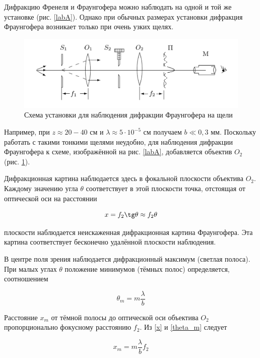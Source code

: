 \documentclass[a4paper,12pt]{article}
\begin{document}
Дифракцию Френеля и Фраунгофера можно наблюдать на одной
и той же установке (рис. \ref{labA}). Однако при обычных размерах установки дифракция Фраунгофера возникает только при очень узких щелях.

\begin{figure}[H]
	\centering
	\includegraphics[scale=0.15]{blab.jpeg}
	\caption{Схема установки для наблюдения дифракции Фраунгофера на щели}
	\label{labB}
\end{figure}

Например, при $ z \approx  20-40 $  см и $  \lambda \approx 5 \cdot 10^{-5}  $   см получаем $  b \ll 0,3 $ мм. Поскольку работать с такими тонкими щелями неудобно, для наблюдения дифракции Фраунгофера к схеме, изображённой на рис. \ref{labA}, добавляется объектив $ O_2  $ (рис. \ref{labB}).

Дифракционная картина наблюдается здесь в фокальной плоскости
объектива $ O_2 $. Каждому значению угла $ \theta $ соответствует в этой плоскости точка, отстоящая от оптической оси на расстоянии

\begin{equation}\label{x}
x = f_2 \tg \theta \approx f_2 \theta
\end{equation}


плоскости наблюдается неискаженная дифракционная картина Фраунгофера. Эта картина соответствует бесконечно удалённой плоскости
наблюдения.

В центре поля зрения наблюдается дифракционный максимум (светлая полоса). При малых углах $ \theta $ положение минимумов (тёмных полос)
определяется, соотношением

\begin{equation}\label{theta_m}
\theta_m = m \dfrac{\lambda}{b}
\end{equation}

Расстояние $ x_m $ от тёмной полосы до оптической оси объектива $ O_2 $ пропорционально фокусному расстоянию $ f_2 $. Из \eqref{x} и \eqref{theta_m} следует 

\begin{equation}\label{xm}
x_m = m \dfrac{\lambda}{b} f_2
\end{equation}
\end{document}
